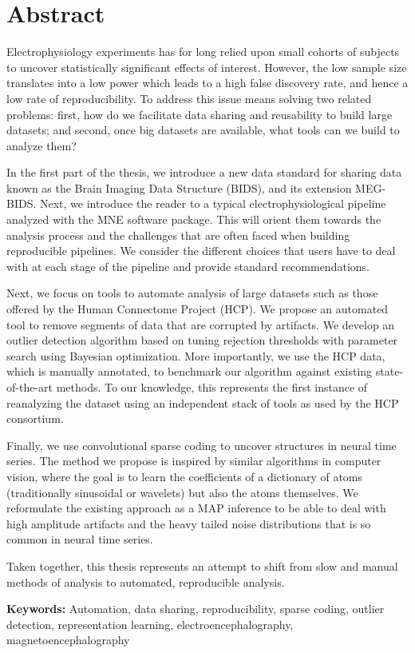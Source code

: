 \chapter*{Abstract}

Electrophysiology experiments has for long relied upon small cohorts of subjects to uncover statistically significant effects of interest. However, the low sample size translates into a low power which leads to a high false discovery rate, and hence a low rate of reproducibility. To address this issue means solving two related problems: first, how do we  facilitate data sharing and reusability to build large datasets; and second, once big datasets are available, what tools can we build to analyze them?

In the first part of the thesis, we introduce a new data standard for sharing data known as the Brain Imaging Data Structure (BIDS), and its extension MEG-BIDS. Next, we introduce the reader to a typical electrophysiological pipeline analyzed with the MNE software package. This will orient them towards the analysis process and the challenges that are often faced when building reproducible pipelines. We consider the different choices that users have to deal with at each stage of the pipeline and provide standard recommendations.

Next, we focus on tools to automate analysis of large datasets such as those offered by the Human Connectome Project (HCP). We propose an automated tool to remove segments of data that are corrupted by artifacts. We develop an outlier detection algorithm based on tuning rejection thresholds with parameter search using Bayesian optimization. More importantly, we use the HCP data, which is manually annotated, to benchmark our algorithm against existing state-of-the-art methods. To our knowledge, this represents the first instance of reanalyzing the dataset using an independent stack of tools as used by the HCP consortium.

Finally, we use convolutional sparse coding to uncover structures in neural time series. The method we propose is inspired by similar algorithms in computer vision, where the goal is to learn the coefficients of a dictionary of atoms (traditionally sinusoidal or wavelets) but also the atoms themselves. We reformulate the existing approach as a \ac{MAP} inference to be able to deal with high amplitude artifacts and the heavy tailed noise distributions that is so common in neural time series. 

Taken together, this thesis represents an attempt to shift from slow and manual methods of analysis to automated, reproducible analysis.

\textbf{Keywords:} Automation, data sharing, reproducibility, sparse coding, outlier detection, representation learning, electroencephalography, magnetoencephalography